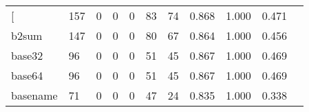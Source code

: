 \begin{longtable}{lp{1.2cm}p{1.2cm}p{1.2cm}p{1.2cm}p{1.2cm}p{1.2cm}p{1.2cm}p{1.2cm}p{1.2cm}p{1.2cm}}
\bottomrule
\endlastfoot
{[}         &                                   157 &                                                  0 &                                                  0 &                                                  0 &                                                 83 &                                                 74 &                                              0.868 &                                              1.000 &                                              0.471 \\
b2sum     &                                   147 &                                                  0 &                                                  0 &                                                  0 &                                                 80 &                                                 67 &                                              0.864 &                                              1.000 &                                              0.456 \\
base32    &                                    96 &                                                  0 &                                                  0 &                                                  0 &                                                 51 &                                                 45 &                                              0.867 &                                              1.000 &                                              0.469 \\
base64    &                                    96 &                                                  0 &                                                  0 &                                                  0 &                                                 51 &                                                 45 &                                              0.867 &                                              1.000 &                                              0.469 \\
basename  &                                    71 &                                                  0 &                                                  0 &                                                  0 &                                                 47 &                                                 24 &                                              0.835 &                                              1.000 &                                              0.338 \\

\end{longtable}
